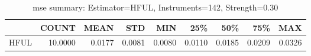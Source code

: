 \begin{table}[ht]
\centering
\caption{mse summary: Estimator=HFUL, Instruments=142, Strength=0.30}
\begin{tabular}{lrrrrrrrr}
\toprule
 & COUNT & MEAN & STD & MIN & 25\% & 50\% & 75\% & MAX \\
\midrule
HFUL & 10.0000 & 0.0177 & 0.0081 & 0.0080 & 0.0110 & 0.0185 & 0.0209 & 0.0326 \\
\bottomrule
\end{tabular}
\end{table}
